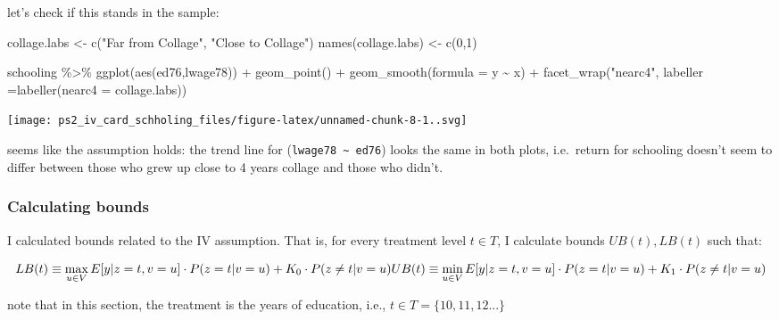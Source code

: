 \documentclass[
]{article}
\newenvironment{Shaded}{\begin{snugshade}}{\end{snugshade}}
\newcommand{\AttributeTok}[1]{\textcolor[rgb]{0.77,0.63,0.00}{#1}}
\newcommand{\DecValTok}[1]{\textcolor[rgb]{0.00,0.00,0.81}{#1}}
\newcommand{\FunctionTok}[1]{\textcolor[rgb]{0.00,0.00,0.00}{#1}}
\newcommand{\NormalTok}[1]{#1}
\newcommand{\OtherTok}[1]{\textcolor[rgb]{0.56,0.35,0.01}{#1}}
\newcommand{\SpecialCharTok}[1]{\textcolor[rgb]{0.00,0.00,0.00}{#1}}
\newcommand{\StringTok}[1]{\textcolor[rgb]{0.31,0.60,0.02}{#1}}
\begin{document}
let's check if this stands in the sample:

\begin{Shaded}
\begin{Highlighting}[]
\NormalTok{collage.labs }\OtherTok{\textless{}{-}} \FunctionTok{c}\NormalTok{(}\StringTok{"Far from Collage"}\NormalTok{, }\StringTok{"Close to Collage"}\NormalTok{)}
\FunctionTok{names}\NormalTok{(collage.labs) }\OtherTok{\textless{}{-}} \FunctionTok{c}\NormalTok{(}\DecValTok{0}\NormalTok{,}\DecValTok{1}\NormalTok{)}

\NormalTok{schooling }\SpecialCharTok{\%\textgreater{}\%}
  \FunctionTok{ggplot}\NormalTok{(}\FunctionTok{aes}\NormalTok{(ed76,lwage78)) }\SpecialCharTok{+}
    \FunctionTok{geom\_point}\NormalTok{() }\SpecialCharTok{+}
    \FunctionTok{geom\_smooth}\NormalTok{(}\AttributeTok{formula =}\NormalTok{ y }\SpecialCharTok{\textasciitilde{}}\NormalTok{ x) }\SpecialCharTok{+}
    \FunctionTok{facet\_wrap}\NormalTok{(}\StringTok{"nearc4"}\NormalTok{, }\AttributeTok{labeller =}\FunctionTok{labeller}\NormalTok{(}\AttributeTok{nearc4 =}\NormalTok{ collage.labs))}
\end{Highlighting}
\end{Shaded}

\texttt{[image: ps2\_iv\_card\_schholing\_files/figure-latex/unnamed-chunk-8-1..svg]}

seems like the assumption holds: the trend line for
(\texttt{lwage78\ \textasciitilde{}\ ed76}) looks the same in both
plots, i.e.~return for schooling doesn't seem to differ between those
who grew up close to 4 years collage and those who didn't.

\hypertarget{calculating-bounds}{%
\subsubsection{Calculating bounds}\label{calculating-bounds}}

I calculated bounds related to the IV assumption. That is, for every
treatment level \(t \in T\), I calculate bounds \(UB(t),LB(t)\) such
that:

\[
LB(t) \equiv \max_{u \in V} E[y|z=t, v= u] \cdot P(z=t|v=u) +K_0 \cdot P(z \ne t|v = u) \\
UB(t) \equiv \min_{u \in V} E[y|z=t, v= u] \cdot P(z=t|v=u) +K_1 \cdot P(z \ne t|v = u) 
\]

note that in this section, the treatment is the years of education,
i.e., \(t \in T = \{10,11,12...\}\)
\end{document}
